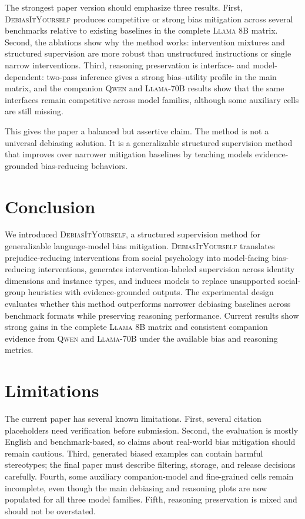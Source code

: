 \documentclass[11pt]{article}
\newcommand{\diy}{\textsc{DebiasItYourself}}
\newcommand{\llama}{\textsc{Llama}}
\newcommand{\qwen}{\textsc{Qwen}}
\begin{document}
The strongest paper version should emphasize three results. First, \diy{} produces competitive or strong bias mitigation across several benchmarks relative to existing baselines in the complete \llama{} 8B matrix. Second, the ablations show why the method works: intervention mixtures and structured supervision are more robust than unstructured instructions or single narrow interventions. Third, reasoning preservation is interface- and model-dependent: two-pass inference gives a strong bias--utility profile in the main matrix, and the companion \qwen{} and \llama{}-70B results show that the same interfaces remain competitive across model families, although some auxiliary cells are still missing.

This gives the paper a balanced but assertive claim. The method is not a universal debiasing solution. It is a generalizable structured supervision method that improves over narrower mitigation baselines by teaching models evidence-grounded bias-reducing behaviors.

\section{Conclusion}
\label{sec:conclusion}

We introduced \diy{}, a structured supervision method for generalizable language-model bias mitigation. \diy{} translates prejudice-reducing interventions from social psychology into model-facing bias-reducing interventions, generates intervention-labeled supervision across identity dimensions and instance types, and induces models to replace unsupported social-group heuristics with evidence-grounded outputs. The experimental design evaluates whether this method outperforms narrower debiasing baselines across benchmark formats while preserving reasoning performance. Current results show strong gains in the complete \llama{} 8B matrix and consistent companion evidence from \qwen{} and \llama{}-70B under the available bias and reasoning metrics.

\section*{Limitations}
\label{sec:limitations}

The current paper has several known limitations. First, several citation placeholders need verification before submission. Second, the evaluation is mostly English and benchmark-based, so claims about real-world bias mitigation should remain cautious. Third, generated biased examples can contain harmful stereotypes; the final paper must describe filtering, storage, and release decisions carefully. Fourth, some auxiliary companion-model and fine-grained cells remain incomplete, even though the main debiasing and reasoning plots are now populated for all three model families. Fifth, reasoning preservation is mixed and should not be overstated.
\end{document}
